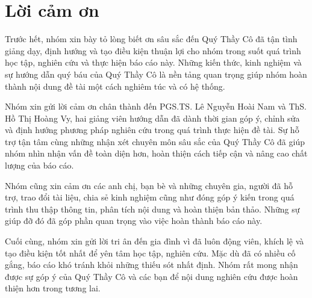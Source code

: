 \chapter*{Lời cảm ơn}
\label{appendix:thanks}

Trước hết, nhóm xin bày tỏ lòng biết ơn sâu sắc đến Quý Thầy Cô đã tận tình giảng dạy, định hướng và tạo điều kiện thuận lợi cho nhóm trong suốt quá trình học tập, nghiên cứu và thực hiện báo cáo này. Những kiến thức, kinh nghiệm và sự hướng dẫn quý báu của Quý Thầy Cô là nền tảng quan trọng giúp nhóm hoàn thành nội dung đề tài một cách nghiêm túc và có hệ thống.

Nhóm xin gửi lời cảm ơn chân thành đến PGS.TS. Lê Nguyễn Hoài Nam và ThS. Hồ Thị Hoàng Vy, hai giảng viên hướng dẫn đã dành thời gian góp ý, chỉnh sửa và định hướng phương pháp nghiên cứu trong quá trình thực hiện đề tài. Sự hỗ trợ tận tâm cùng những nhận xét chuyên môn sâu sắc của Quý Thầy Cô đã giúp nhóm nhìn nhận vấn đề toàn diện hơn, hoàn thiện cách tiếp cận và nâng cao chất lượng của báo cáo.

Nhóm cũng xin cảm ơn các anh chị, bạn bè và những chuyên gia, người đã hỗ trợ, trao đổi tài liệu, chia sẻ kinh nghiệm cũng như đóng góp ý kiến trong quá trình thu thập thông tin, phân tích nội dung và hoàn thiện bản thảo. Những sự giúp đỡ đó đã góp phần quan trọng vào việc hoàn thành báo cáo này.

Cuối cùng, nhóm xin gửi lời tri ân đến gia đình vì đã luôn động viên, khích lệ và tạo điều kiện tốt nhất để yên tâm học tập, nghiên cứu. Mặc dù đã có nhiều cố gắng, báo cáo khó tránh khỏi những thiếu sót nhất định. Nhóm rất mong nhận được sự góp ý của Quý Thầy Cô và các bạn để nội dung nghiên cứu được hoàn thiện hơn trong tương lai.
